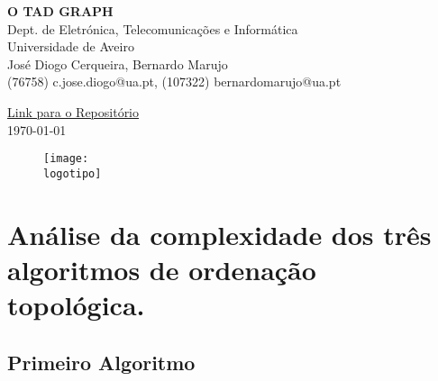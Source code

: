 \documentclass{report}
\begin{document}
%
\def\titulo{O TAD GRAPH}
\def\data{\today}
\def\autores{José Diogo Cerqueira, Bernardo Marujo}
\def\autorescontactos{(76758) c.jose.diogo@ua.pt, (107322) bernardomarujo@ua.pt}
\def\departamento{Dept. de Eletrónica, Telecomunicações e Informática}
\def\empresa{Universidade de Aveiro}
\def\logotipo{ua.pdf}
\def\repositorio{\href{https://github.com/detiuaveiro/trabalho2-76758-107322}{Link para o Repositório}}
%
%

%
%
\begin{titlepage}

\begin{center}
%
\vspace*{50mm}
%
{\Huge\textbf{\titulo}}\\
{\Large \departamento\\ \empresa}\\
%
\vspace{10mm}
%
%
{\LARGE \autores\\ \autorescontactos } \\ 

\hfill

\repositorio\\
%
\vspace{10mm}
%
\data
%
\vspace{20mm}
%
\begin{figure}[h]
\center
\texttt{[image: \\logotipo]}
\end{figure}
%
\end{center}
%
\end{titlepage}


\tableofcontents



\clearpage
{}


\chapter{Análise da complexidade dos três algoritmos de ordenação topológica.}

\hfill

\hfill


\section{Primeiro Algoritmo}
\end{document}
